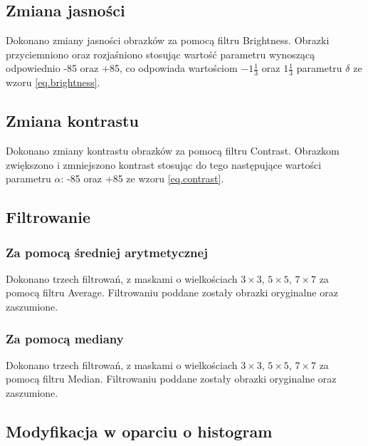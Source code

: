 \documentclass{classrep}
\begin{document}
\subsection{Zmiana jasności}
\label{sec.tests.brightness}
Dokonano zmiany jasności obrazków za pomocą filtru Brightness. Obrazki przyciemniono oraz rozjaśniono stosując wartość parametru wynoszącą odpowiednio -85 oraz +85, co odpowiada wartościom $-1\frac{1}{3}$ oraz $1\frac{1}{3}$ parametru $\delta$ ze wzoru \ref{eq.brightness}.

\subsection{Zmiana kontrastu}
\label{sec.tests.contrast}
Dokonano zmiany kontrastu obrazków za pomocą filtru Contrast. Obrazkom zwiększono i zmniejszono kontrast stosując do tego następujące wartości parametru $\alpha$: -85 oraz +85 ze wzoru \ref{eq.contrast}.

\subsection{Filtrowanie}
\label{sec.tests.filtering}
\subsubsection{Za pomocą średniej arytmetycznej}
\label{sec.tests.filtering.average}
Dokonano trzech filtrowań, z maskami o wielkościach $3 \times 3$, $5 \times 5$, $7 \times 7$ za pomocą filtru Average. Filtrowaniu poddane zostały obrazki oryginalne oraz zaszumione.

\subsubsection{Za pomocą mediany}
\label{sec.tests.filtering.median}
Dokonano trzech filtrowań, z maskami o wielkościach $3 \times 3$, $5 \times 5$, $7 \times 7$ za pomocą filtru Median. Filtrowaniu poddane zostały obrazki oryginalne oraz zaszumione.

\subsection{Modyfikacja w oparciu o histogram}
\label{sec.tests.histogram}
\end{document}

